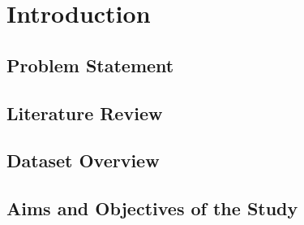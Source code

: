 %
%
\chapter{Introduction}
   \section{Problem Statement}
   \section{Literature Review}
   \section{Dataset Overview}
   \section{Aims and Objectives of the Study} 
\cleardoublepage